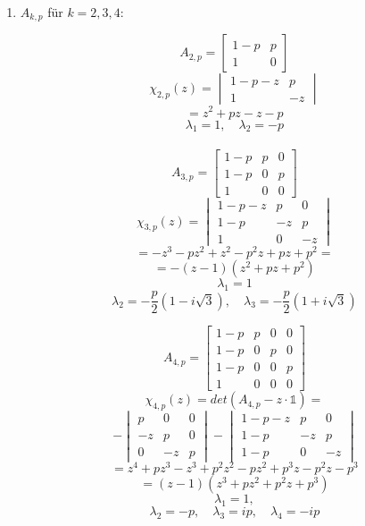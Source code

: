\begin{enumerate}
\item
  $A_{k,p}$ für $k = 2, 3, 4$:

  \begin{minipage}{0.4\linewidth}
  \[ A_{2,p} = \begin{bmatrix} 1-p & p \\ 1 & 0 \end{bmatrix} \]
  \[ \chi_{2,p}(z) = \begin{vmatrix} 1-p-z & p \\ 1 & -z \end{vmatrix} \]
  \[ = z^{2} + pz - z - p \]
  \[ \lambda_{1} = 1, \quad \lambda_{2}= -p \] \\[0.5em]
  \[ A_{3,p} = \begin{bmatrix} 1-p & p & 0 \\
                               1-p & 0 & p \\
                                 1 & 0 & 0 \end{bmatrix} \]
  \[ \chi_{3,p}(z) = \begin{vmatrix} 1-p-z & p  & 0 \\
                                       1-p   & -z & p \\
                                       1     & 0  & -z \end{vmatrix} \]
  \[ = -z^{3} - pz^{2} + z^{2} - p^{2}z + pz + p^{2} = \]
  \[ = -(z - 1) (z^{2} + pz + p^{2}) \]
  \[ \lambda_{1}= 1 \]
  \[ \lambda_{2}= -\frac{p}{2}(1 - i\sqrt{3}), \quad
     \lambda_{3}= -\frac{p}{2}(1 + i\sqrt{3}) \]
  \end{minipage}\hfill\begin{minipage}{0.5\linewidth}
  \[ A_{4,p} = \begin{bmatrix} 1-p & p & 0 & 0 \\
                               1-p & 0 & p & 0 \\
                               1-p & 0 & 0 & p \\
                                 1 & 0 & 0 & 0 \end{bmatrix} \]
  \[ \chi_{4,p}(z) = det(A_{4,p} - z\cdot \mathds{1}) = \]
  \[                 -\begin{vmatrix} p & 0 & 0 \\
                                     -z & p & 0 \\
                                      0 &-z & p \end{vmatrix} 
                     -\begin{vmatrix} 1-p-z & p & 0 \\
                                      1-p & -z & p \\
                                      1-p & 0 & -z \end{vmatrix} \]
  \[ = z^4 + pz^3 - z^3 + p^{2}z^2 - pz^2 + p^{3}z - p^{2}z -p^3 \]
  \[ = (z - 1) (z^{3} + pz^{2} + p^{2}z + p^{3}) \]
  \[ \lambda_{1}= 1, \]
  \[ \lambda_{2}= -p, \quad
     \lambda_{3}= ip, \quad
     \lambda_{4}= -ip\]
  \end{minipage}
  

\end{enumerate}

